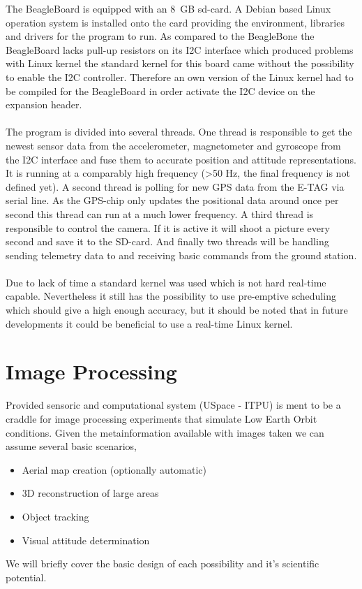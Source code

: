The BeagleBoard is equipped with an 8~GB sd-card. A Debian based Linux
operation system is installed onto the card providing the environment,
libraries and drivers for the program to run. As compared to the BeagleBone the
BeagleBoard lacks pull-up resistors on its I2C interface which produced
problems with Linux kernel the standard kernel for this board came without the
possibility to enable the I2C controller. Therefore an own version of the Linux
kernel had to be compiled for the BeagleBoard in order activate the I2C device
on the expansion header. 
\\
\\
The program is divided into several threads. One thread is responsible to get
the newest sensor data from the accelerometer, magnetometer and gyroscope
from the I2C interface and fuse them to accurate position and attitude
representations. It is running at a comparably high frequency (>50 Hz, the final
frequency is not defined yet).  A second thread is polling for new GPS data from
the E-TAG via serial line. As the GPS-chip only updates the positional data
around once per second this thread can run at a much lower frequency.
A third thread is responsible to control the camera. If it is active it will
shoot a picture every second and save it to the SD-card. And finally two
threads will be handling sending telemetry data to and receiving basic commands
from the ground station.
\\
\\
Due to lack of time a standard kernel was used which is not hard real-time
capable. Nevertheless it still has the possibility to use pre-emptive scheduling
which should give a high enough accuracy, but it should be noted that in future
developments it could be beneficial to use a real-time Linux kernel. 

\FloatBarrier
\section{Image Processing}
Provided sensoric and computational system (USpace - ITPU) is ment to be a craddle for image 
processing experiments that simulate Low Earth Orbit conditions. Given the metainformation 
available with images taken we can assume several basic scenarios,
\begin{itemize}
\item Aerial map creation (optionally automatic)
\item 3D reconstruction of large areas
\item Object tracking
\item Visual attitude determination
\end{itemize}
We will briefly cover the basic design of each possibility and it's scientific potential.

